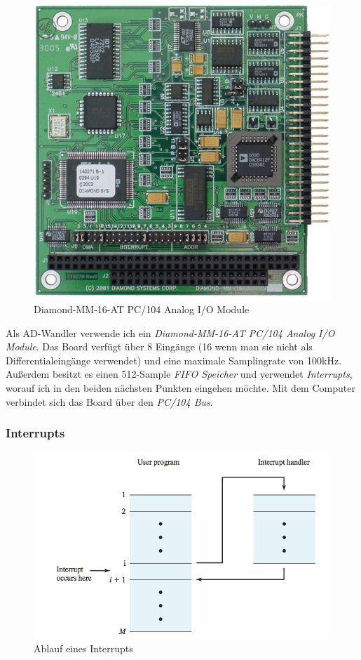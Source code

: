 \documentclass[12pt,a4paper]{scrartcl}
\begin{document}
\begin{figure}[H]
\centering
\includegraphics[scale=.4]{hardwareimages/diamondmm16at.jpg}
\caption{Diamond-MM-16-AT PC/104 Analog I/O Module}
\label{diamond}
\end{figure}



Als AD-Wandler verwende ich ein \textit{Diamond-MM-16-AT PC/104 Analog I/O Module}. Das Board verfügt über 8 Eingänge (16 wenn man sie nicht als Differentialeingänge verwendet) und eine maximale Samplingrate von 100kHz. Außerdem besitzt es einen 512-Sample \textit{FIFO Speicher} und verwendet \textit{Interrupts}, worauf ich in den beiden nächsten Punkten eingehen möchte.
Mit dem Computer verbindet sich das Board über den \textit{PC/104 Bus}.


\subsubsection{Interrupts}

\begin{figure}[H]
\centering
\includegraphics[scale=1.4]{interrupt.png}
\caption{Ablauf eines Interrupts \citep{Stallings:2000uq}}
\label{interrupt}
\end{figure}
\end{document}
